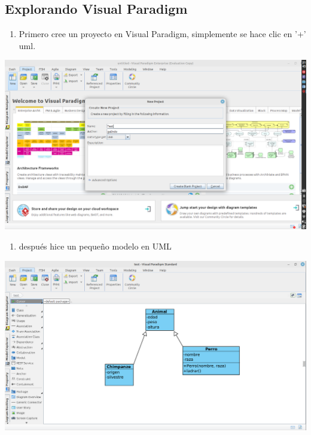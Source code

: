 \documentclass[12pt]{article}
\begin{document}
\subsection*{Explorando Visual Paradigm}
\label{sec:orgbd46073}
\begin{enumerate}
\item Primero cree un proyecto en Visual Paradigm, simplemente se hace clic en '+' uml.
\end{enumerate}
\begin{center}
\includegraphics[width=.9\linewidth]{./img/1.png}
\end{center}

\begin{enumerate}
\item después hice un pequeño modelo en UML
\end{enumerate}
\begin{center}
\includegraphics[width=.9\linewidth]{./img/2.png}
\end{center}
\end{document}
